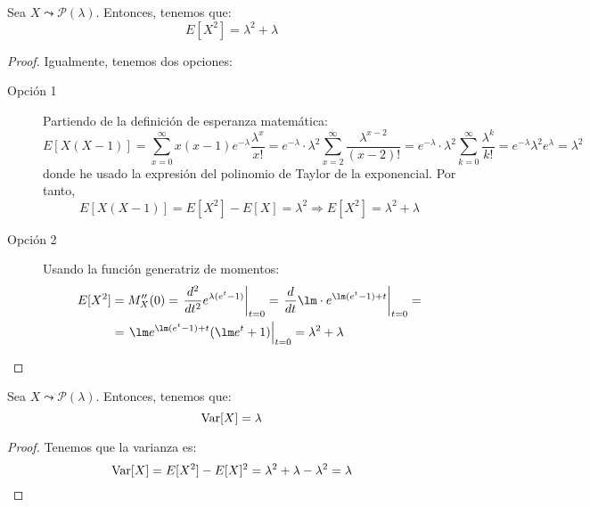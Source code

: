 \begin{lema}
    Sea $X\leadsto \mathcal{P}(\lambda)$. Entonces, tenemos que:
    \begin{equation*}
        E[X^2]= \lambda^2+\lambda
    \end{equation*}
\end{lema}
\begin{proof} 
    Igualmente, tenemos dos opciones:
    \begin{description}
        \item[Opción 1]  Partiendo de la definición de esperanza matemática:
        \begin{equation*}
            E[X(X-1)]=\sum_{x=0}^\infty x(x-1)e^{-\lambda}\frac{\lambda^x}{x!}
            = e^{-\lambda}\cdot \lambda^2 \sum_{x=2}^\infty \frac{\lambda^{x-2}}{(x-2)!}
            = e^{-\lambda}\cdot \lambda^2 \sum_{k=0}^\infty \frac{\lambda^k}{k!} = e^{-\lambda}\lambda^2 e^{\lambda}=\lambda^2
        \end{equation*}
        donde he usado la expresión del polinomio de Taylor de la exponencial. Por tanto,
        \begin{equation*}
            E[X(X-1)]=E[X^2]-E[X]=\lambda^2 \Longrightarrow E[X^2]=\lambda^2 +\lambda
        \end{equation*}

        \item [Opción 2] Usando la función generatriz de momentos:
        \begin{align*}
            E[X^2]&=M_X''(0)=\left. \frac{d^2}{dt^2} e^{\lambda(e^t-1)}\right|_{t=0} = \left. \dfrac{d}{dt} \lm \cdot e^{\lm (e^t-1) +t}\right|_{t=0} =\\&= \left.\lm e^{\lm(e^t-1)+t}(\lm e^t+1)\right|_{t=0} = \lambda^2+\lambda
        \end{align*}
    \end{description}
\end{proof}

\begin{coro}
    Sea $X\leadsto \mathcal{P}(\lambda)$. Entonces, tenemos que:
    \begin{equation*}
        \operatorname{Var}[X]= \lambda
    \end{equation*}
\end{coro}
\begin{proof} Tenemos que la varianza es:
    \begin{equation*}
        \operatorname{Var}[X]=E[X^2]-E[X]^2 = \lambda^2+\lambda-\lambda^2=\lambda
    \end{equation*}
\end{proof}


